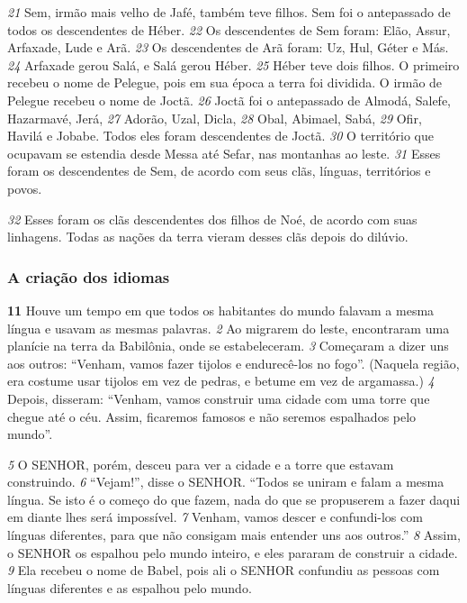 \bigskip
\textit{\tiny 21}
 Sem, irmão mais velho de Jafé, também teve filhos. Sem foi o antepassado de todos os descendentes de Héber. 
\textit{\tiny 22}
 Os descendentes de Sem foram: Elão, Assur, Arfaxade, Lude e Arã. 
\textit{\tiny 23}
 Os descendentes de Arã foram: Uz, Hul, Géter e Más. 
\textit{\tiny 24}
 Arfaxade gerou Salá, e Salá gerou Héber. 
\textit{\tiny 25}
 Héber teve dois filhos. O primeiro recebeu o nome de Pelegue, pois em sua época a terra foi dividida. O irmão de Pelegue recebeu o nome de Joctã. 
\textit{\tiny 26}
 Joctã foi o antepassado de Almodá, Salefe, Hazarmavé, Jerá, 
\textit{\tiny 27}
 Adorão, Uzal, Dicla, 
\textit{\tiny 28}
 Obal, Abimael, Sabá, 
\textit{\tiny 29}
 Ofir, Havilá e Jobabe. Todos eles foram descendentes de Joctã. 
\textit{\tiny 30}
 O território que ocupavam se estendia desde Messa até Sefar, nas montanhas ao leste. 
\textit{\tiny 31}
 Esses foram os descendentes de Sem, de acordo com seus clãs, línguas, territórios e povos.



\bigskip
\textit{\tiny 32}
 Esses foram os clãs descendentes dos filhos de Noé, de acordo com suas linhagens. Todas as nações da terra vieram desses clãs depois do dilúvio.



\bigskip
\subsubsection*{A criação dos idiomas}
\textbf{\large 11}
 Houve um tempo em que todos os habitantes do mundo falavam a mesma língua e usavam as mesmas palavras. 
\textit{\tiny 2}
 Ao migrarem do leste, encontraram uma planície na terra da Babilônia, onde se estabeleceram. 
\textit{\tiny 3}
 Começaram a dizer uns aos outros: “Venham, vamos fazer tijolos e endurecê-los no fogo”. (Naquela região, era costume usar tijolos em vez de pedras, e betume em vez de argamassa.) 
\textit{\tiny 4}
 Depois, disseram: “Venham, vamos construir uma cidade com uma torre que chegue até o céu. Assim, ficaremos famosos e não seremos espalhados pelo mundo”.



\bigskip
\textit{\tiny 5}
 O SENHOR, porém, desceu para ver a cidade e a torre que estavam construindo. 
\textit{\tiny 6}
 “Vejam!”, disse o SENHOR. “Todos se uniram e falam a mesma língua. Se isto é o começo do que fazem, nada do que se propuserem a fazer daqui em diante lhes será impossível. 
\textit{\tiny 7}
 Venham, vamos descer e confundi-los com línguas diferentes, para que não consigam mais entender uns aos outros.” 
\textit{\tiny 8}
 Assim, o SENHOR os espalhou pelo mundo inteiro, e eles pararam de construir a cidade. 
\textit{\tiny 9}
 Ela recebeu o nome de Babel, pois ali o SENHOR confundiu as pessoas com línguas diferentes e as espalhou pelo mundo.



